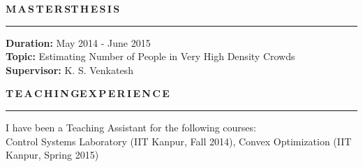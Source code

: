 \documentclass[11pt, a4paper]{article}
\begin{document}
\vspace{-2pt}

\textbf{M\,A\,S\,T\,E\,R\,S{\hspace{0.6em}}T\,H\,E\,S\,I\,S}
\vspace{5pt}
\hrule
\vspace{7pt}
\textbf{Duration: }May 2014 - June 2015 \\
\textbf{Topic: }Estimating Number of People in Very High Density Crowds \\
\textbf{Supervisor: }K. S. Venkatesh 

\vspace{8pt}

\textbf{T\,E\,A\,C\,H\,I\,N\,G{\hspace{0.6em}}E\,X\,P\,E\,R\,I\,E\,N\,C\,E}
\vspace{5pt}
\hrule
\vspace{7pt}
I have been a Teaching Assistant for the following courses:\\
Control Systems Laboratory (IIT Kanpur, Fall 2014), Convex Optimization (IIT Kanpur, Spring 2015)


%
%
%
%
%
%
%
%
%
%
\end{document}
